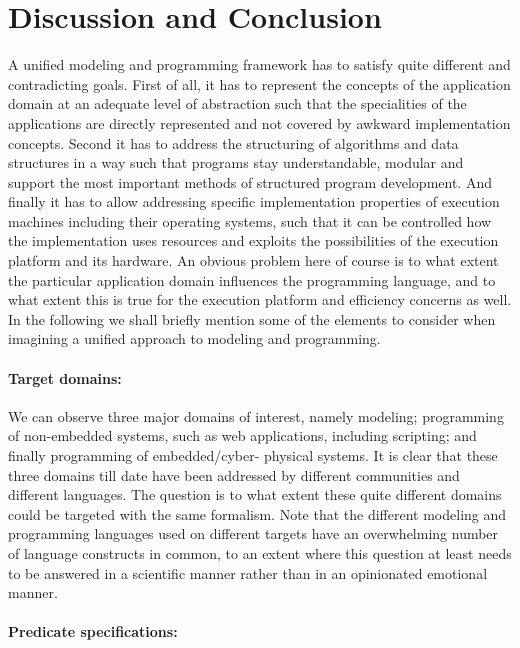 
\section{Discussion and Conclusion}
\label{sec:conclusion}


\label{sec:concerns}

A unified modeling and programming framework has to satisfy 
quite different and contradicting goals.
First of all, it has to represent the concepts of the 
application domain at an adequate level of 
abstraction such that the specialities of the applications 
are directly represented and not covered by awkward implementation 
concepts.  
Second it has to address the structuring of algorithms and data 
structures in a way such that programs stay understandable, 
modular and support the most important methods of structured 
program development. And finally it has to allow addressing 
specific implementation properties of execution machines including 
their operating systems, such that it can be controlled how the 
implementation uses resources and exploits the possibilities of 
the execution platform and its hardware. An obvious problem here 
of course is to what extent the particular application domain 
influences the programming language, and to what extent this 
is true for the execution platform and efficiency concerns as
well. In the following we shall briefly mention some of the
elements to consider when imagining a unified approach to
modeling and programming.


\paragraph{Target domains:}

We can observe three major domains of interest, namely modeling; 
programming of non-embedded systems, such as web applications, 
including scripting; and finally programming of embedded/cyber-
physical systems. It is clear that these three domains till date 
have been addressed by different communities and different 
languages. The question is to what extent these
quite different domains could be targeted with the same formalism.
Note that the different modeling and programming languages used on
different targets have an overwhelming number of language constructs in
common, to an extent where this question at least needs to be answered
in a scientific manner rather than in an opinionated emotional manner.

\paragraph{Predicate specifications:}

